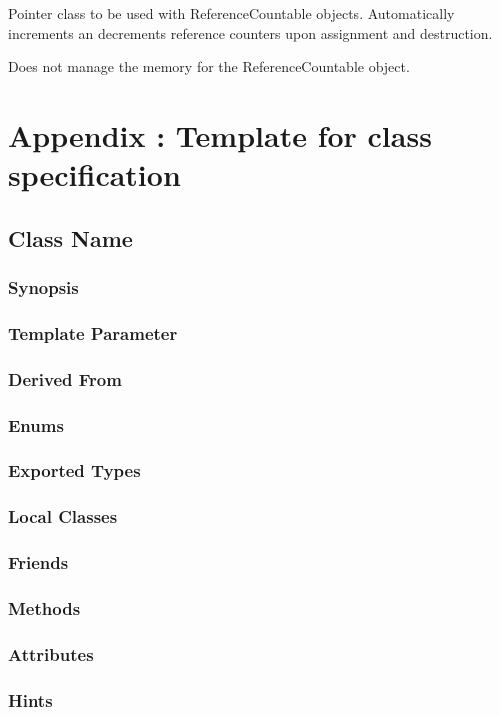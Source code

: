 \documentclass[11pt,a4paper,DIV11,%
notitlepage,oneside,abstracton,%
bibtotoc]{scrartcl}
\begin{document}
Pointer class to be used with ReferenceCountable
objects. Automatically increments an decrements reference counters
upon assignment and destruction.

Does not manage the memory for the ReferenceCountable object.


\section{Appendix : Template for class specification}

\subsection{Class Name}

\subsubsection{Synopsis}
\subsubsection{Template Parameter}
\subsubsection{Derived From}
\subsubsection{Enums}
\subsubsection{Exported Types}
\subsubsection{Local Classes}
\subsubsection{Friends}
\subsubsection{Methods}
\subsubsection{Attributes}
\subsubsection{Hints}




\end{document}
